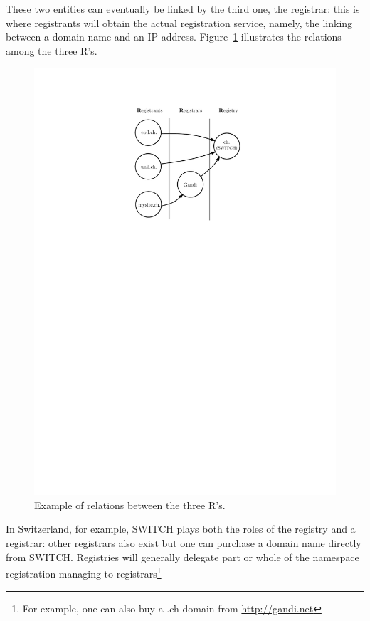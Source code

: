 \documentclass[a4paper,twocolumn]{scrartcl}
\begin{document}
These two entities can eventually be linked by the third one, the registrar: this is where registrants will obtain the actual registration service, namely, the linking between a domain name and an IP address. Figure~\ref{fig:3Rs} illustrates the relations among the three R's.

\begin{figure}
\center
  \includegraphics[width=\linewidth]{3Rs}
  \caption{Example of relations between the three R's.}
  \label{fig:3Rs}
\end{figure}

In Switzerland, for example, SWITCH plays both the roles of the registry and a registrar: other registrars also exist but one can purchase a domain name directly from SWITCH. Registries will generally delegate part or whole of the namespace registration managing to registrars\footnote{For example, one can also buy a .ch domain from \url{http://gandi.net}}
\end{document}
